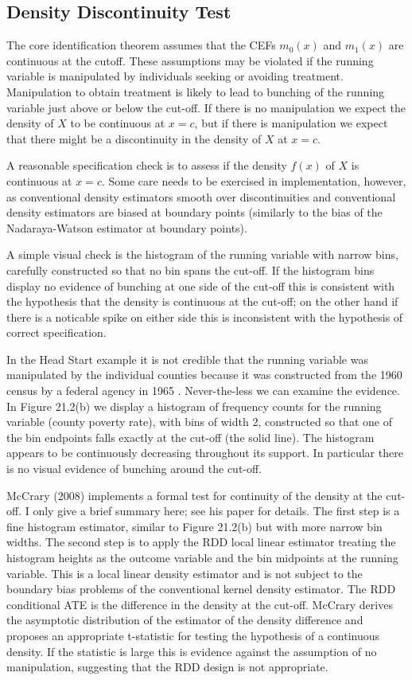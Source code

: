 \documentclass[10pt]{article}
\begin{document}
\subsection{Density Discontinuity Test}
The core identification theorem assumes that the CEFs $m_{0}(x)$ and $m_{1}(x)$ are continuous at the cutoff. These assumptions may be violated if the running variable is manipulated by individuals seeking or avoiding treatment. Manipulation to obtain treatment is likely to lead to bunching of the running variable just above or below the cut-off. If there is no manipulation we expect the density of $X$ to be continuous at $x=c$, but if there is manipulation we expect that there might be a discontinuity in the density of $X$ at $x=c$.

A reasonable specification check is to assess if the density $f(x)$ of $X$ is continuous at $x=c$. Some care needs to be exercised in implementation, however, as conventional density estimators smooth over discontinuities and conventional density estimators are biased at boundary points (similarly to the bias of the Nadaraya-Watson estimator at boundary points).

A simple visual check is the histogram of the running variable with narrow bins, carefully constructed so that no bin spans the cut-off. If the histogram bins display no evidence of bunching at one side of the cut-off this is consistent with the hypothesis that the density is continuous at the cut-off; on the other hand if there is a noticable spike on either side this is inconsistent with the hypothesis of correct specification.

In the Head Start example it is not credible that the running variable was manipulated by the individual counties because it was constructed from the 1960 census by a federal agency in 1965 . Never-the-less we can examine the evidence. In Figure 21.2(b) we display a histogram of frequency counts for the running variable (county poverty rate), with bins of width 2, constructed so that one of the bin endpoints falls exactly at the cut-off (the solid line). The histogram appears to be continuously decreasing throughout its support. In particular there is no visual evidence of bunching around the cut-off.

McCrary (2008) implements a formal test for continuity of the density at the cut-off. I only give a brief summary here; see his paper for details. The first step is a fine histogram estimator, similar to Figure 21.2(b) but with more narrow bin widths. The second step is to apply the RDD local linear estimator treating the histogram heights as the outcome variable and the bin midpoints at the running variable. This is a local linear density estimator and is not subject to the boundary bias problems of the conventional kernel density estimator. The RDD conditional ATE is the difference in the density at the cut-off. McCrary derives the asymptotic distribution of the estimator of the density difference and proposes an appropriate t-statistic for testing the hypothesis of a continuous density. If the statistic is large this is evidence against the assumption of no manipulation, suggesting that the RDD design is not appropriate.
\end{document}
